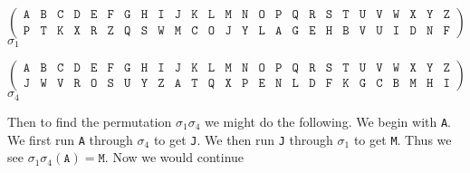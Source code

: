 \begin{center}
  \[
    \left(
      \begin{array}{llllllllllllllllllllllllll}
        \texttt{A} & \texttt{B} & \texttt{C} & \texttt{D} &
        \texttt{E} & \texttt{F} & \texttt{G} & \texttt{H} &
        \texttt{I} & \texttt{J} & \texttt{K} & \texttt{L} &
        \texttt{M} & \texttt{N} & \texttt{O} & \texttt{P} &
        \texttt{Q} & \texttt{R} & \texttt{S} & \texttt{T} &
        \texttt{U} & \texttt{V} & \texttt{W} & \texttt{X} &
        \texttt{Y} & \texttt{Z}                             \\
        \texttt{P} & \texttt{T} & \texttt{K} & \texttt{X} &
        \texttt{R} & \texttt{Z} & \texttt{Q} & \texttt{S} &
        \texttt{W} & \texttt{M} & \texttt{C} & \texttt{O} &
        \texttt{J} & \texttt{Y} & \texttt{L} & \texttt{A} &
        \texttt{G} & \texttt{E} & \texttt{H} & \texttt{B} &
        \texttt{V} & \texttt{U} & \texttt{I} & \texttt{D} &
        \texttt{N} & \texttt{F}
      \end{array}
    \right)
  \]
  $\sigma_1$
\end{center}
\begin{center}
  \[
    \left(
      \begin{array}{llllllllllllllllllllllllll}
        \texttt{A} & \texttt{B} & \texttt{C} & \texttt{D} &
        \texttt{E} & \texttt{F} & \texttt{G} & \texttt{H} &
        \texttt{I} & \texttt{J} & \texttt{K} & \texttt{L} &
        \texttt{M} & \texttt{N} & \texttt{O} & \texttt{P} &
        \texttt{Q} & \texttt{R} & \texttt{S} & \texttt{T} &
        \texttt{U} & \texttt{V} & \texttt{W} & \texttt{X} &
        \texttt{Y} & \texttt{Z}                             \\
        \texttt{J} & \texttt{W} & \texttt{V} & \texttt{R} &
        \texttt{O} & \texttt{S} & \texttt{U} & \texttt{Y} &
        \texttt{Z} & \texttt{A} & \texttt{T} & \texttt{Q} &
        \texttt{X} & \texttt{P} & \texttt{E} & \texttt{N} &
        \texttt{L} & \texttt{D} & \texttt{F} & \texttt{K} &
        \texttt{G} & \texttt{C} & \texttt{B} & \texttt{M} &
        \texttt{H} & \texttt{I}
      \end{array}
    \right)
  \]
  $\sigma_4$
\end{center}
Then to find the permutation $\sigma_1\sigma_4$ we might do the
following. We begin with \texttt{A}. We first run \texttt{A} through
$\sigma_4$ to get \texttt{J}. We then run \texttt{J} through
$\sigma_1$ to get \texttt{M}. Thus we see
$\sigma_1\sigma_4(\texttt{A}) = \texttt{M}$. Now we would continue
